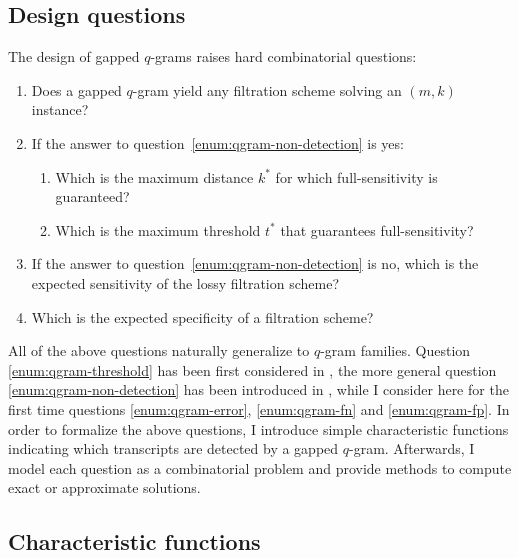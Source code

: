 \subsection{Design questions}

The design of gapped $q$-grams raises hard combinatorial questions:
\begin{enumerate} %
\item \label{enum:qgram-non-detection} Does a gapped $q$-gram yield any filtration scheme solving an $(m,k)$ instance? 
\item If the answer to question~\ref{enum:qgram-non-detection} is yes:
\begin{enumerate}
\item \label{enum:qgram-error} Which is the maximum distance $k^*$ for which full-sensitivity is guaranteed?
\item \label{enum:qgram-threshold} Which is the maximum threshold $t^*$ that guarantees full-sensitivity?
\end{enumerate}
\item \label{enum:qgram-fn} If the answer to question~\ref{enum:qgram-non-detection} is no, which is the expected sensitivity of the lossy filtration scheme?
\item \label{enum:qgram-fp} Which is the expected specificity of a filtration scheme?
\end{enumerate}

All of the above questions naturally generalize to $q$-gram families.
Question \ref{enum:qgram-threshold} has been first considered in \citep{Burkhardt2001,Kucherov2005}, the more general question \ref{enum:qgram-non-detection} has been introduced in \citep{Nicolas2005}, while I consider here for the first time questions \ref{enum:qgram-error}, \ref{enum:qgram-fn} and \ref{enum:qgram-fp}.
In order to formalize the above questions, I introduce simple characteristic functions indicating which transcripts are detected by a gapped $q$-gram.
Afterwards, I model each question as a combinatorial problem and provide methods to compute exact or approximate solutions.

\subsection{Characteristic functions}

